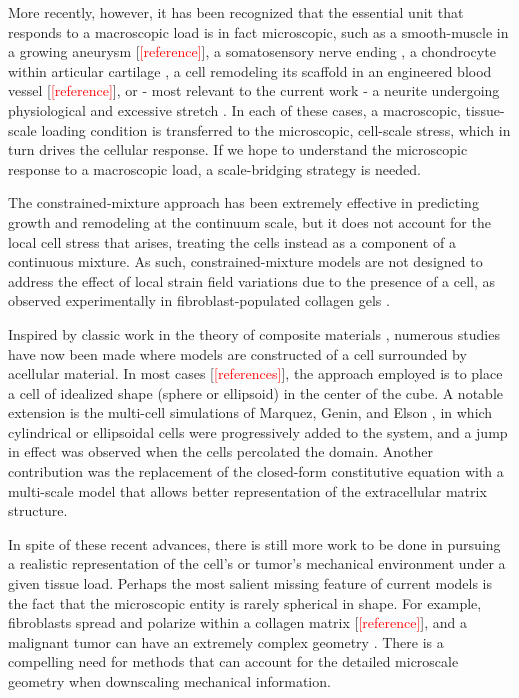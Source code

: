 \documentclass[]{interact}
\newcommand{\red}[1]{\textcolor{red}{[#1]}}
\begin{document}
More recently, however, it has been recognized that the essential unit that responds to a macroscopic load is in fact microscopic, such as a smooth-muscle in a growing aneurysm [\red{reference}], a somatosensory nerve ending \citep{Quindlen:2016ik}, a chondrocyte within articular cartilage \citep{Guilak:2000ir}, a cell remodeling its scaffold in an engineered blood vessel [\red{reference}], or - most relevant to the current work - a neurite undergoing physiological and excessive stretch \citep{Zhang:2017gr,Sperry:2017ez}. In each of these cases, a macroscopic, tissue-scale loading condition is transferred to the microscopic, cell-scale stress, which in turn drives the cellular response. If we hope to understand the microscopic response to a macroscopic load, a scale-bridging strategy is needed.

The constrained-mixture approach \citep{Humphrey:2002ga} has been extremely effective in predicting growth and remodeling at the continuum scale, but it does not account for the local cell stress that arises, treating the cells instead as a component of a continuous mixture. As such, constrained-mixture models are not designed to address the effect of local strain field variations due to the presence of a cell, as observed experimentally in fibroblast-populated collagen gels \citep{Pizzo:2005hv}. 

Inspired by classic work in the theory of composite materials \citep{Hashin:1962tm}, numerous studies have now been made where models are constructed of a cell surrounded by acellular material. In most cases [\red{references}], the approach employed is to place a cell of idealized shape (sphere or ellipsoid) in the center of the cube. A notable extension is the multi-cell simulations of Marquez, Genin, and Elson \citep{Marquez:2010dm}, in which cylindrical or ellipsoidal cells were progressively added to the system, and a jump in effect was observed when the cells percolated the domain.  Another contribution \citep{Lai:2013fp} was the replacement of the closed-form constitutive equation with a multi-scale model that allows better representation of the extracellular matrix structure.

In spite of these recent advances, there is still more work to be done in pursuing a realistic representation of the cell's or tumor's mechanical environment under a given tissue load. Perhaps the most salient missing feature of current models is the fact that the microscopic entity is rarely spherical in shape.  For example, fibroblasts spread and polarize within a collagen matrix [\red{reference}], and a malignant tumor can have an extremely complex geometry \citep{Cristini:2003ja}. There is a compelling need for methods that can account for the detailed microscale geometry when downscaling mechanical information.
\end{document}
